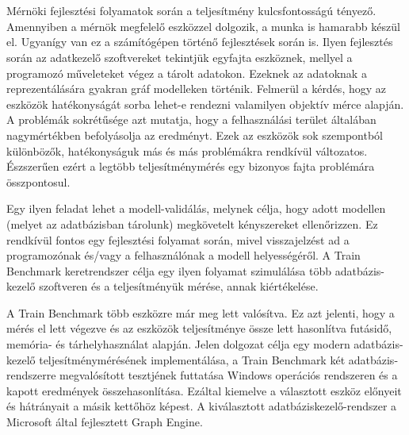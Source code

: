\chapter{\bevezetes}

Mérnöki fejlesztési folyamatok során a teljesítmény kulcsfontosságú tényező. Amennyiben a mérnök megfelelő eszközzel dolgozik, a munka is hamarabb készül el. Ugyanígy van ez a számítógépen történő fejlesztések során is. Ilyen fejlesztés során az adatkezelő szoftvereket tekintjük egyfajta eszköznek, mellyel a programozó műveleteket végez a tárolt adatokon. Ezeknek az adatoknak a reprezentálására gyakran gráf modelleken történik. Felmerül a kérdés, hogy az eszközök hatékonyságát sorba lehet-e rendezni valamilyen objektív mérce alapján. A problémák sokrétűsége azt mutatja, hogy a felhasználási terület általában nagymértékben befolyásolja az eredményt. Ezek az eszközök sok szempontból különbözők, hatékonyságuk más és más problémákra rendkívül változatos. Észszerűen ezért a legtöbb teljesítménymérés egy bizonyos fajta problémára összpontosul.

Egy ilyen feladat lehet a modell-validálás, melynek célja, hogy adott modellen (melyet az adatbázisban tárolunk) megkövetelt kényszereket ellenőrizzen. Ez rendkívül fontos egy fejlesztési folyamat során, mivel visszajelzést ad a programozónak és/vagy a felhasználónak a modell helyességéről. A Train Benchmark keretrendszer célja egy ilyen folyamat szimulálása több adatbázis-kezelő szoftveren és a teljesítményük mérése, annak kiértékelése.



A Train Benchmark több eszközre már meg lett valósítva.\cite{Szárnyas2017} Ez azt jelenti, hogy a mérés el lett végezve és az eszközök teljesítménye össze lett hasonlítva futásidő, memória- és tárhelyhasználat alapján.  Jelen dolgozat célja egy modern adatbázis-kezelő teljesítménymérésének implementálása, a Train Benchmark két adatbázis-rendszerre megvalósított tesztjének futtatása Windows operációs rendszeren és a kapott eredmények összehasonlítása. Ezáltal kiemelve a választott eszköz előnyeit és hátrányait a másik kettőhöz képest. A kiválasztott adatbáziskezelő-rendszer a Microsoft által fejlesztett Graph Engine.

